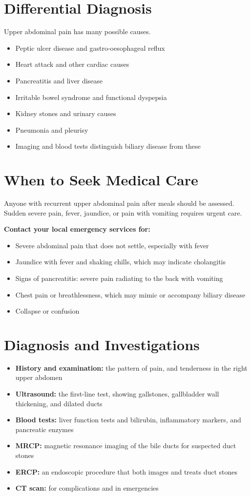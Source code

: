 \section*{Differential Diagnosis}
Upper abdominal pain has many possible causes.
\begin{itemize}
    \item Peptic ulcer disease and gastro-oesophageal reflux
    \item Heart attack and other cardiac causes
    \item Pancreatitis and liver disease
    \item Irritable bowel syndrome and functional dyspepsia
    \item Kidney stones and urinary causes
    \item Pneumonia and pleurisy
    \item Imaging and blood tests distinguish biliary disease from these
\end{itemize}

\section*{When to Seek Medical Care}
Anyone with recurrent upper abdominal pain after meals should be assessed. Sudden severe pain, fever, jaundice, or pain with vomiting requires urgent care.

\textbf{Contact your local emergency services for:}
\begin{itemize}
    \item Severe abdominal pain that does not settle, especially with fever
    \item Jaundice with fever and shaking chills, which may indicate cholangitis
    \item Signs of pancreatitis: severe pain radiating to the back with vomiting
    \item Chest pain or breathlessness, which may mimic or accompany biliary disease
    \item Collapse or confusion
\end{itemize}

\section*{Diagnosis and Investigations}
\begin{itemize}
    \item \textbf{History and examination:} the pattern of pain, and tenderness in the right upper abdomen
    \item \textbf{Ultrasound:} the first-line test, showing gallstones, gallbladder wall thickening, and dilated ducts
    \item \textbf{Blood tests:} liver function tests and bilirubin, inflammatory markers, and pancreatic enzymes
    \item \textbf{MRCP:} magnetic resonance imaging of the bile ducts for suspected duct stones
    \item \textbf{ERCP:} an endoscopic procedure that both images and treats duct stones
    \item \textbf{CT scan:} for complications and in emergencies
\end{itemize}

